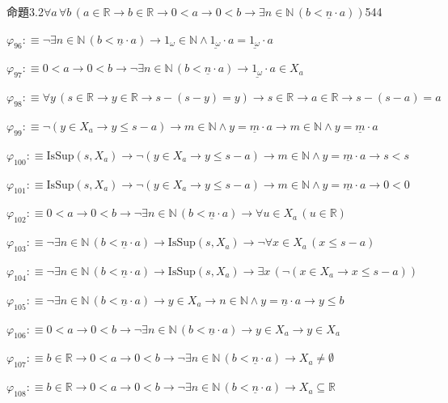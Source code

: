 \begin{fullproof}{命題3.2}{$\forall a\,\forall b\,(a \in \mathbb{R} \to b \in \mathbb{R} \to 0 < a \to 0 < b \to \exists n \in \mathbb{N}\,(b < \underline{n} \cdot a))$}{544}
\begin{abbrevlist}
\item $\varphi_{96} :\equiv \neg \exists n \in \mathbb{N}\,(b < \underline{n} \cdot a) \to 1_{\omega} \in \mathbb{N} \land \underline{1_{\omega}} \cdot a = \underline{1_{\omega}} \cdot a$
\item $\varphi_{97} :\equiv 0 < a \to 0 < b \to \neg \exists n \in \mathbb{N}\,(b < \underline{n} \cdot a) \to \underline{1_{\omega}} \cdot a \in X_{a}$
\item $\varphi_{98} :\equiv \forall y\,(s \in \mathbb{R} \to y \in \mathbb{R} \to s - (s - y) = y) \to s \in \mathbb{R} \to a \in \mathbb{R} \to s - (s - a) = a$
\item $\varphi_{99} :\equiv \neg (y \in X_{a} \to y \leq s - a) \to m \in \mathbb{N} \land y = \underline{m} \cdot a \to m \in \mathbb{N} \land y = \underline{m} \cdot a$
\item $\varphi_{100} :\equiv \mathrm{IsSup}(s,X_{a}) \to \neg (y \in X_{a} \to y \leq s - a) \to m \in \mathbb{N} \land y = \underline{m} \cdot a \to s < s$
\item $\varphi_{101} :\equiv \mathrm{IsSup}(s,X_{a}) \to \neg (y \in X_{a} \to y \leq s - a) \to m \in \mathbb{N} \land y = \underline{m} \cdot a \to 0 < 0$
\item $\varphi_{102} :\equiv 0 < a \to 0 < b \to \neg \exists n \in \mathbb{N}\,(b < \underline{n} \cdot a) \to \forall u \in X_{a}\,(u \in \mathbb{R})$
\item $\varphi_{103} :\equiv \neg \exists n \in \mathbb{N}\,(b < \underline{n} \cdot a) \to \mathrm{IsSup}(s,X_{a}) \to \neg \forall x \in X_{a}\,(x \leq s - a)$
\item $\varphi_{104} :\equiv \neg \exists n \in \mathbb{N}\,(b < \underline{n} \cdot a) \to \mathrm{IsSup}(s,X_{a}) \to \exists x\,(\neg (x \in X_{a} \to x \leq s - a))$
\item $\varphi_{105} :\equiv \neg \exists n \in \mathbb{N}\,(b < \underline{n} \cdot a) \to y \in X_{a} \to n \in \mathbb{N} \land y = \underline{n} \cdot a \to y \leq b$
\item $\varphi_{106} :\equiv 0 < a \to 0 < b \to \neg \exists n \in \mathbb{N}\,(b < \underline{n} \cdot a) \to y \in X_{a} \to y \in X_{a}$
\item $\varphi_{107} :\equiv b \in \mathbb{R} \to 0 < a \to 0 < b \to \neg \exists n \in \mathbb{N}\,(b < \underline{n} \cdot a) \to X_{a} \neq \emptyset$
\item $\varphi_{108} :\equiv b \in \mathbb{R} \to 0 < a \to 0 < b \to \neg \exists n \in \mathbb{N}\,(b < \underline{n} \cdot a) \to X_{a} \subseteq \mathbb{R}$

\end{abbrevlist}
\end{fullproof}
